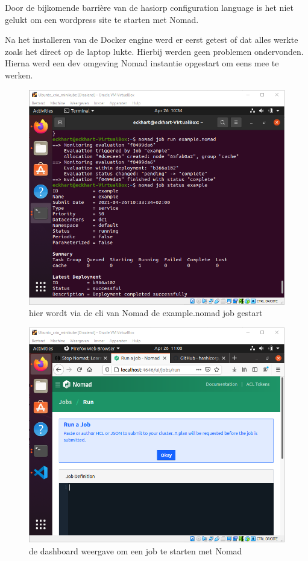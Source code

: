 Door de bijkomende barrière van de hasiorp configuration language is het niet gelukt om een wordpress site te starten met Nomad.

Na het installeren van de Docker engine werd er eerst getest of dat alles  werkte zoals het direct op de laptop lukte. Hierbij werden geen problemen ondervonden. Hierna werd een dev omgeving Nomad instantie opgestart om eens mee te werken.
\begin{figure}[h]
    \includegraphics[width=\linewidth]{img/nomadrun.png}
    \caption[Een voorbeeld Nomad job]{hier wordt via de cli van Nomad de example.nomad job gestart}
    \label{fig:nomadrun}
    \centering
\end{figure}
\begin{figure}[h]
    \includegraphics[width=\linewidth]{img/nomdaddash.png}
    \caption[de nomad dashboard]{de dashboard weergave om een job te starten met Nomad}
    \label{fig:nomdaddash}
    \centering
\end{figure}


